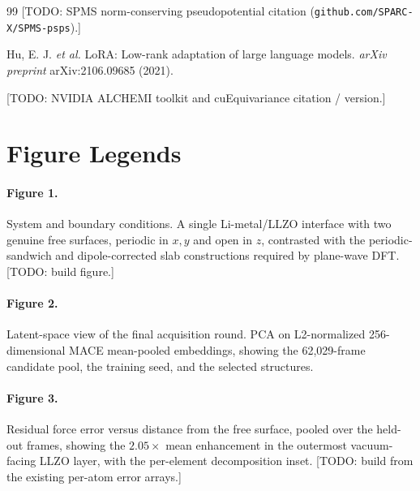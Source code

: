 \documentclass[11pt]{article}
\begin{document}
\begin{thebibliography}{99}
[TODO: SPMS norm-conserving pseudopotential citation
(\texttt{github.com/SPARC-X/SPMS-psps}).]

Hu, E. J. \emph{et al.} LoRA: Low-rank adaptation of large language models.
\emph{arXiv preprint} arXiv:2106.09685 (2021).

[TODO: NVIDIA ALCHEMI toolkit and cuEquivariance citation / version.]



\end{thebibliography}

\section*{Figure Legends}

\paragraph{Figure 1.} System and boundary conditions. A single Li-metal/LLZO
interface with two genuine free surfaces, periodic in $x,y$ and open in $z$,
contrasted with the periodic-sandwich and dipole-corrected slab constructions
required by plane-wave DFT. [TODO: build figure.]

\paragraph{Figure 2.} \label{fig:latent} Latent-space view of the final
acquisition round. PCA on L2-normalized 256-dimensional MACE mean-pooled
embeddings, showing the 62{,}029-frame candidate pool, the training seed, and
the selected structures.

\paragraph{Figure 3.} \label{fig:surface} Residual force error versus distance
from the free surface, pooled over the held-out frames, showing the
$2.05\times$ mean enhancement in the outermost vacuum-facing LLZO layer, with
the per-element decomposition inset. [TODO: build from the existing per-atom
error arrays.]
\end{document}
